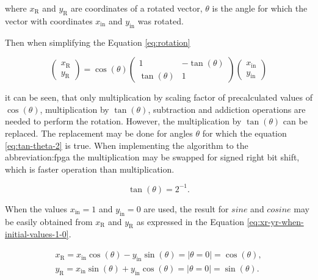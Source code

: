 \documentclass[a4paper, twoside, 11pt]{article}
\begin{document}
        where $x_\text{R}$ and $y_\text{R}$ are coordinates of a rotated vector, $\theta$ is the angle for which the vector with coordinates $x_\text{in}$ and $y_\text{in}$ was rotated.\par
        Then when simplifying the Equation \ref{eq:rotation}


        \begin{equation}\label{eq:rotation-simplifying}
             \begin{pmatrix}
                 x_\text{R}\\
                 y_\text{R}
             \end{pmatrix}
             = \cos (\theta)
             \begin{pmatrix}
                 1 & -\tan (\theta)\\
                 \tan (\theta) & 1
             \end{pmatrix}
             \begin{pmatrix}
                 x_\text{in}\\
                 y_\text{in}
             \end{pmatrix}
        \end{equation}

        \noindent it can be seen, that only multiplication by scaling factor of precalculated values of $\cos (\theta)$, multiplication by $\tan (\theta)$, subtraction and addiction operations are needed to perform the rotation. However, the multiplication by $\tan (\theta)$ can be replaced. The replacement may be done for angles $\theta$ for which the equation \ref{eq:tan-theta-2} is true. When implementing the algorithm to the \gls{abbreviation:fpga} the multiplication may be swapped for signed right bit shift, which is faster operation than multiplication.

        \begin{equation}\label{eq:tan-theta-2}
            \tan (\theta) = 2^{-1}.
        \end{equation}
        \par
        When the values $x_\text{in} = 1$ and $y_\text{in} = 0$ are used, the result for $sine$ and $cosine$ may be easily obtained from $x_\text{R}$ and $y_\text{R}$ as expressed in the Equation \ref{eq:xr-yr-when-initial-values-1-0}.

        \begin{equation}\label{eq:xr-yr-when-initial-values-1-0}
            \begin{gathered}
            x_\text{R} = x_\text{in} \cos (\theta) - y_\text{in} \sin (\theta) = | \theta = 0 | = \cos (\theta),\\
            y_\text{R} = x_\text{in} \sin (\theta) + y_\text{in} \cos (\theta) = | \theta = 0 | = \sin (\theta).
            \end{gathered}
        \end{equation}
\end{document}
